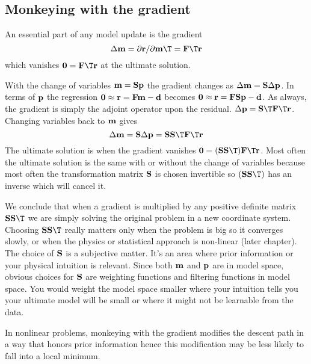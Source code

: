\subsection{ Monkeying with the gradient }
An essential part of any model update is the gradient
\begin{equation}
\Delta \bold m = \partial \bold r / \partial \bold m\T = \bold F\T \bold r 
\end{equation}
which vanishes $\bold 0=\bold F\T \bold r$ at the ultimate solution.
\par
With the change of variables $\bold m = \bold S \bold p$ the gradient changes as
$\Delta \bold m = \bold S \Delta \bold p$.
In terms of $\bold p$ the regression
$\bold 0 \approx \bold r = \bold F \bold m - \bold d$
becomes
$\bold 0 \approx \bold r = \bold F \bold S \bold p - \bold d$.
As always, the gradient is simply the adjoint operator upon the residual.
$\Delta \bold p = \bold S\T \bold F\T \bold r$.
Changing variables back to $\bold m$ gives
\begin{equation}
\Delta \bold m = \bold S \Delta \bold p = \bold S \bold S\T \bold F\T \bold r
\end{equation}
The ultimate solution is when the gradient vanishes $\bold 0 = (\bold S\bold S\T) \bold F\T \bold r$.
Most often the ultimate solution is the same with or without the change of variables
because most often the transformation matrix $\bold S$
is chosen invertible so $ (\bold S\bold S\T)$ has an inverse which will cancel it.
\par
We conclude that when a gradient is multiplied by any
positive definite matrix $\bold S\bold S\T$
we are simply solving the original problem in a new coordinate system.
Choosing $\bold S\bold S\T$
really matters only when the problem is big so it converges slowly,
or when the physics or statistical approach is non-linear (later chapter).
The choice of $\bold S$ is a subjective matter.
It's an area where prior information or your physical intuition is relevant.
Since both $\bold m$ and $\bold p$ are in model space,
obvious choices for $\bold S$ are weighting functions
and filtering functions in model space.
You would weight the model space smaller where your intuition
tells you your ultimate model will be small or where it might not be
learnable from the data.
\par
In nonlinear problems, monkeying with the gradient modifies the descent path
in a way that honors prior information
hence this modification may be less likely to fall into a local minimum.




